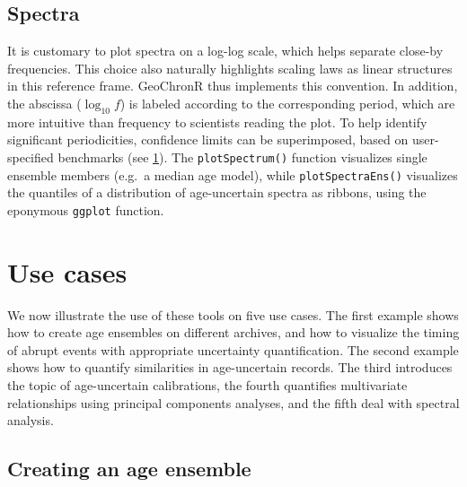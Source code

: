 \documentclass[gc, manuscript]{copernicus}
\begin{document}
\subsection{Spectra}

It is customary to plot spectra on a log-log scale, which helps separate
close-by frequencies. This choice also naturally highlights scaling laws
\citep[\citet{ZhuPNAS2019}]{lovejoy2013weather} as linear structures in
this reference frame. GeoChronR thus implements this convention. In
addition, the abscissa (\(\log_{10} f\)) is labeled according to the
corresponding period, which are more intuitive than frequency to
scientists reading the plot. To help identify significant periodicities,
confidence limits can be superimposed, based on user-specified
benchmarks (see \ref{sec:use-cases}). The \texttt{plotSpectrum()}
function visualizes single ensemble members (e.g.~a median age model),
while \texttt{plotSpectraEns()} visualizes the quantiles of a
distribution of age-uncertain spectra as ribbons, using the eponymous
\texttt{ggplot} function.

\section{Use cases}\label{sec:use-cases}

We now illustrate the use of these tools on five use cases. The first
example shows how to create age ensembles on different archives, and how
to visualize the timing of abrupt events with appropriate uncertainty
quantification. The second example shows how to quantify similarities in
age-uncertain records. The third introduces the topic of age-uncertain
calibrations, the fourth quantifies multivariate relationships using
principal components analyses, and the fifth deal with spectral
analysis.

\subsection{Creating an age ensemble}
\end{document}
